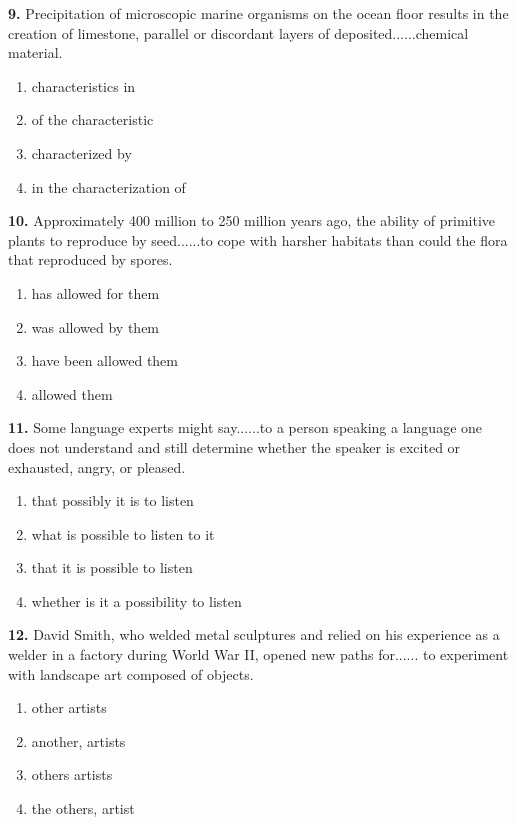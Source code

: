 \documentclass[12pt]{article}
\begin{document}
\par
\vspace{0.25\baselineskip}
\noindent\textbf{9.} Precipitation of microscopic marine organisms on the ocean floor results in the creation of limestone, parallel or discordant layers of deposited......chemical material.
\begin{enumerate}[label=(\Alph*),leftmargin=*,itemsep=0.2em]
\item characteristics in
\item of the characteristic
\item characterized by
\item in the characterization of
\end{enumerate}
\par
\vspace{0.25\baselineskip}
\noindent\textbf{10.} Approximately 400 million to 250 million years ago, the ability of primitive plants to reproduce by seed......to cope with harsher habitats than could the flora that reproduced by spores.
\begin{enumerate}[label=(\Alph*),leftmargin=*,itemsep=0.2em]
\item has allowed for them
\item was allowed by them
\item have been allowed them
\item allowed them
\end{enumerate}
\par
\vspace{0.25\baselineskip}
\noindent\textbf{11.} Some language experts might say......to a person speaking a language one does not understand and still determine whether the speaker is excited or exhausted, angry, or pleased.
\begin{enumerate}[label=(\Alph*),leftmargin=*,itemsep=0.2em]
\item that possibly it is to listen
\item what is possible to listen to it
\item that it is possible to listen
\item whether is it a possibility to listen
\end{enumerate}
\par
\vspace{0.25\baselineskip}
\noindent\textbf{12.} David Smith, who welded metal sculptures and relied on his experience as a welder in a factory during World War II, opened new paths for...... to experiment with landscape art composed of objects.
\begin{enumerate}[label=(\Alph*),leftmargin=*,itemsep=0.2em]
\item other artists
\item another, artists
\item others artists
\item the others, artist
\end{enumerate}
\end{document}

